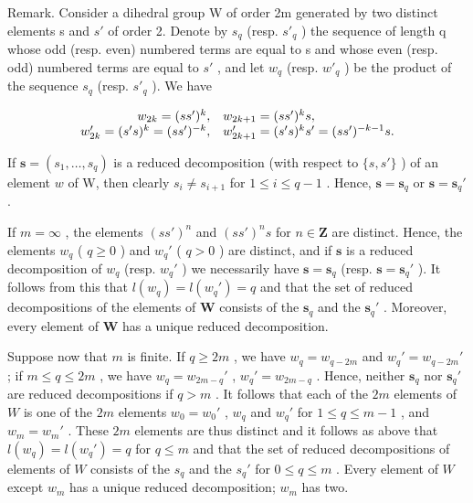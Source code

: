 Remark. Consider a dihedral group W of order 2m generated by two distinct elements s and \(s'\) of order 2. Denote by \(s_{q}\) (resp. \(s'_{q}\) ) the sequence of length q whose odd (resp. even) numbered terms are equal to s and whose even (resp. odd) numbered terms are equal to \(s'\) , and let \(w_{q}\) (resp. \(w'_{q}\) ) be the product of the sequence \(s_{q}\) (resp. \(s'_{q}\) ). We have

\[
\begin{array}{r l} w _ {2 k} = (s s ^ {\prime}) ^ {k}, & w _ {2 k + 1} = (s s ^ {\prime}) ^ {k} s, \\ w _ {2 k} ^ {\prime} = (s ^ {\prime} s) ^ {k} = (s s ^ {\prime}) ^ {- k}, & w _ {2 k + 1} ^ {\prime} = (s ^ {\prime} s) ^ {k} s ^ {\prime} = (s s ^ {\prime}) ^ {- k - 1} s. \end{array}
\]

If \(\mathbf{s} = (s_1, \ldots, s_q)\) is a reduced decomposition (with respect to \(\{s, s'\}\) ) of an element \(w\) of W, then clearly \(s_i \neq s_{i+1}\) for \(1 \leqslant i \leqslant q-1\) . Hence, \(\mathbf{s} = \mathbf{s}_q\) or \(\mathbf{s} = \mathbf{s}_q'\) .

If \(m = \infty\) , the elements \((ss')^n\) and \((ss')^ns\) for \(n \in \mathbf{Z}\) are distinct. Hence, the elements \(w_q\) ( \(q \geqslant 0\) ) and \(w_q'\) ( \(q > 0\) ) are distinct, and if \(\mathbf{s}\) is a reduced decomposition of \(w_q\) (resp. \(w_q'\) ) we necessarily have \(\mathbf{s} = \mathbf{s}_q\) (resp. \(\mathbf{s} = \mathbf{s}_q'\) ). It follows from this that \(l(w_q) = l(w_q') = q\) and that the set of reduced decompositions of the elements of \(\mathbf{W}\) consists of the \(\mathbf{s}_q\) and the \(\mathbf{s}_q'\) . Moreover, every element of \(\mathbf{W}\) has a unique reduced decomposition.

Suppose now that \(m\) is finite. If \(q \geqslant 2m\) , we have \(w_{q} = w_{q - 2m}\) and \(w_{q}' = w_{q - 2m}'\) ; if \(m \leqslant q \leqslant 2m\) , we have \(w_{q} = w_{2m - q}'\) , \(w_{q}' = w_{2m - q}\) . Hence, neither \(\mathbf{s}_q\) nor \(\mathbf{s}_q'\) are reduced decompositions if \(q > m\) . It follows that each of the \(2m\) elements of \(W\) is one of the \(2m\) elements \(w_0 = w_0'\) , \(w_q\) and \(w_q'\) for \(1 \leqslant q \leqslant m - 1\) , and \(w_m = w_m'\) . These \(2m\) elements are thus distinct and it follows as above that \(l(w_q) = l(w_q') = q\) for \(q \leqslant m\) and that the set of reduced decompositions of elements of \(W\) consists of the \(s_q\) and the \(s_q'\) for \(0 \leqslant q \leqslant m\) . Every element of \(W\) except \(w_m\) has a unique reduced decomposition; \(w_m\) has two.

